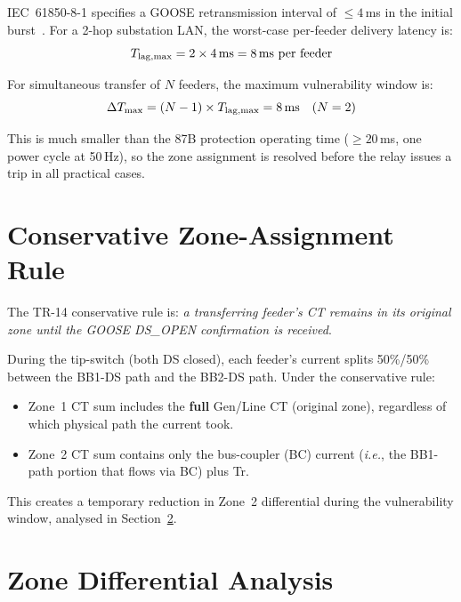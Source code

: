 \documentclass[11pt, a4paper]{article}
\begin{document}
IEC~61850-8-1 specifies a GOOSE retransmission interval of $\leq 4$\,ms in
the initial burst~\cite{IEC_61850_8_1,IEC_61850_5}.  For a 2-hop substation
LAN, the worst-case per-feeder delivery latency is:
\begin{equation}
  T_{\rm lag,max} = 2 \times 4\,\text{ms} = 8\,\text{ms per feeder}
\end{equation}

For simultaneous transfer of $N$ feeders, the maximum vulnerability window is:
\begin{equation}
  \Delta T_{\rm max} = (N-1) \times T_{\rm lag,max}
  = 8\,\text{ms} \quad (N=2)
\end{equation}

This is much smaller than the 87B protection operating time ($\geq 20$\,ms,
one power cycle at 50\,Hz), so the zone assignment is resolved before the
relay issues a trip in all practical cases.


\section{Conservative Zone-Assignment Rule}
\label{sec:rule}

The TR-14 conservative rule is: \emph{a transferring feeder's CT remains in
its original zone until the GOOSE DS\_OPEN confirmation is received}.

During the tip-switch (both DS closed), each feeder's current splits 50\%/50\%
between the BB1-DS path and the BB2-DS path.  Under the conservative rule:
\begin{itemize}
  \item Zone~1 CT sum includes the \textbf{full} Gen/Line CT (original zone),
        regardless of which physical path the current took.
  \item Zone~2 CT sum contains only the bus-coupler (BC) current
        (\textit{i.e.}, the BB1-path portion that flows via BC) plus Tr.
\end{itemize}

This creates a temporary reduction in Zone~2 differential during the
vulnerability window, analysed in Section~\ref{sec:diff}.


\section{Zone Differential Analysis}
\label{sec:diff}
\end{document}
